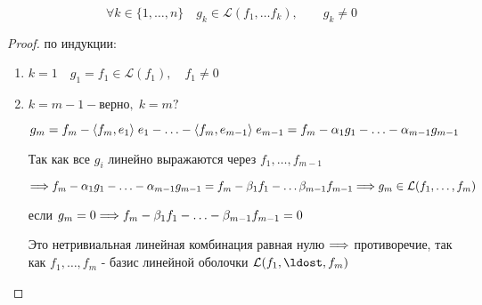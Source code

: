 \vspace{0.4cm}

\begin{shth}
    \begin{lemma}
        \[ \forall k \in {\{1, \ldots, n \}} \quad g_{k} \in \mathcal{L}(f_{1}, \ldots f_{k}), \qquad g_{k} \neq 0 \]
    \end{lemma}
\end{shth}

\vspace{0.4cm}
\begin{proof}
    по индукции:
    
    \begin{enumerate}
    
    
        \item $ k = 1 \quad g_{1} = f_{1} \in \mathcal{L}(f_{1}), \quad f_{1} \neq 0$
        
        
        \item $k = m - 1  - \text{верно}, \; k = m ?$ 
        \nl

        $g_{m} = f_{m} - \langle f_{m}, e_{1} \rangle \; e_{1} - \ldots - \langle f_{m}, e_{m-1} \rangle \; e_{m-1} = f_{m} - \alpha_{1} g_{1} - \ldots - \alpha_{m-1} g_{m-1}$
        \nl
        
        Так как все $g_{i}$ линейно выражаются через $f_{1}, \ldots, f_{m-1}$
        \nl
        
        $\lra  f_{m} - \alpha_{1} g_{1} - \ldots - \alpha_{m-1} g_{m-1} = f_{m} - \beta_{1}f_{1} - \ldots \beta_{m-1}f_{m-1} \quad  \nl \lra g_{m} \in \mathcal{L}(f_{1}, \ldots, f_{m})$        
        \nl 
        
        если $g_{m} = 0 \Longrightarrow f_{m} - \beta_{1}f_{1} - \ldots - \beta_{m-1}f_{m-1} = 0$
        \nl 
        
        Это нетривиальная линейная комбинация равная нулю $\Longrightarrow$ противоречие, \nl так как $f_{1}, \ldots, f_{m}$ - базис линейной оболочки $\mathcal{L}(f_{1}, \ldost, f_{m})$ 
    \end{enumerate}
\end{proof}

\clearpage

